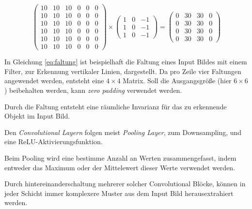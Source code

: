 \vspace{1cm}
\begin{equation}
    \label{eq:faltung}
    \begin{pmatrix}
        10 & 10 & 10 & 0 & 0 & 0\\
        10 & 10 & 10 & 0 & 0 & 0\\
        10 & 10 & 10 & 0 & 0 & 0\\
        10 & 10 & 10 & 0 & 0 & 0\\
        10 & 10 & 10 & 0 & 0 & 0\\
        10 & 10 & 10 & 0 & 0 & 0
    \end{pmatrix}
    \times
    \begin{pmatrix}
        1 & 0 & -1\\
        1 & 0 & -1\\
        1 & 0 & -1
    \end{pmatrix}
    = 
    \begin{pmatrix}
        0 & 30 & 30 & 0\\
        0 & 30 & 30 & 0\\
        0 & 30 & 30 & 0\\
        0 & 30 & 30 & 0
    \end{pmatrix}
\end{equation}
\vspace{0.5cm}
\begin{figure}[H]
    \centering
    \def\svgwidth{0.6\textwidth}
    
    \caption{}
    \label{fig:faltung3}
\end{figure}

In Gleichung \ref{eq:faltung} ist beispielhaft die Faltung 
eines Input Bildes mit einem Filter, zur Erkennung 
vertikaler Linien, dargestellt. Da pro Zeile 
vier Faltungen angewendet werden, entsteht 
eine $4\times4$ Matrix. Soll die Ausgangsgröße 
(hier $6\times6$) beibehalten werden, kann
\textit{zero padding} verwendet werden.

Durch die Faltung entsteht eine räumliche 
Invarianz für das zu erkennende Objekt im 
Input Bild.

Den \textit{Convolutional Layern} folgen meist \textit{Pooling Layer}, 
zum Downsampling, und eine ReLU-Aktivierungsfunktion.

Beim Pooling wird eine bestimme Anzahl an Werten 
zusammengefasst, indem entweder das Maximum oder der 
Mittelewert dieser Werte verwendet werden.

Durch hintereinanderschaltung mehrerer solcher Convolutional Blöcke,
können in jeder Schicht immer komplexere Muster aus dem 
Input Bild herausextrahiert werden.


